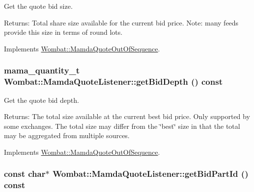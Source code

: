 Get the quote bid size. 

\begin{Desc}
\item[Returns:]Total share size available for the current bid price. Note: many feeds provide this size in terms of round lots. \end{Desc}


Implements \hyperlink{classWombat_1_1MamdaQuoteOutOfSequence_75acf46a72e24b7d535bdcc4d495566a}{Wombat::Mamda\-Quote\-Out\-Of\-Sequence}.\hypertarget{classWombat_1_1MamdaQuoteListener_3f4909f6e25bef5324df4c4fa89bda74}{
\subsubsection[getBidDepth]{\setlength{\rightskip}{0pt plus 5cm}mama\_\-quantity\_\-t Wombat::Mamda\-Quote\-Listener::get\-Bid\-Depth () const}}
\label{classWombat_1_1MamdaQuoteListener_3f4909f6e25bef5324df4c4fa89bda74}


Get the quote bid depth. 

\begin{Desc}
\item[Returns:]The total size available at the current best bid price. Only supported by some exchanges. The total size may differ from the \char`\"{}best\char`\"{} size in that the total may be aggregated from multiple sources. \end{Desc}


Implements \hyperlink{classWombat_1_1MamdaQuoteOutOfSequence_3f27ce9e3648fbacc6cfdd4cb19c4f2c}{Wombat::Mamda\-Quote\-Out\-Of\-Sequence}.\hypertarget{classWombat_1_1MamdaQuoteListener_0256d6b1b2181919a00cf6d6e903b014}{
\subsubsection[getBidPartId]{\setlength{\rightskip}{0pt plus 5cm}const char$\ast$ Wombat::Mamda\-Quote\-Listener::get\-Bid\-Part\-Id () const}}
\label{classWombat_1_1MamdaQuoteListener_0256d6b1b2181919a00cf6d6e903b014}


